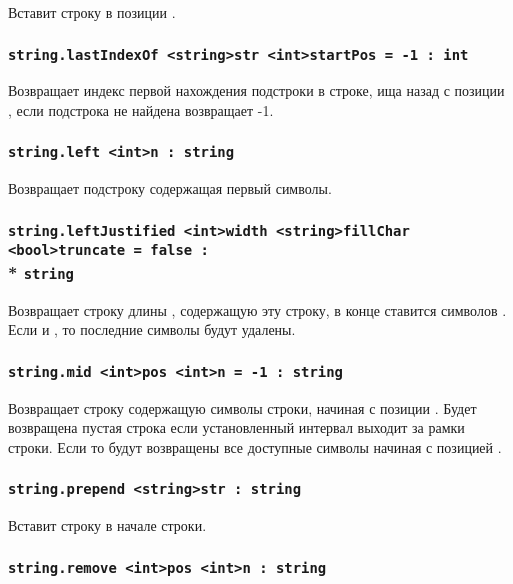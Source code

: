 Вставит строку  в позиции .

\subsubsection{\lstinline|string.lastIndexOf <string>str <int>startPos = -1 : int|}

Возвращает индекс первой нахождения подстроки  в строке, ища назад с позиции , если подстрока не найдена возвращает -1.

\subsubsection{\lstinline|string.left <int>n : string|}

Возвращает подстроку содержащая первый  символы.

\subsubsection{\lstinline|string.leftJustified <int>width <string>fillChar <bool>truncate = false :|\\* \lstinline|string|}

Возвращает строку длины , содержащую эту строку, в конце ставится  символов . Если  и , то последние  символы будут удалены.

\subsubsection{\lstinline|string.mid <int>pos <int>n = -1 : string|}

Возвращает строку содержащую  символы строки, начиная с позиции . Будет возвращена пустая строка если установленный интервал выходит за рамки строки. Если  то будут возвращены все доступные символы начиная с позицией .

\subsubsection{\lstinline|string.prepend <string>str : string|}

Вставит строку  в начале строки.

\subsubsection{\lstinline|string.remove <int>pos <int>n : string|}

